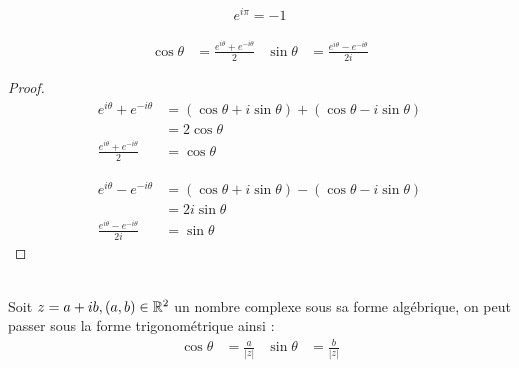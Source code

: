     \begin{graybox}
    \begin{proposition}
    \begin{align*}
        e^{i \pi} = -1 
    \end{align*}
\end{proposition}
    \end{graybox}

    \begin{graybox}
    \begin{proposition}
    \begin{align*}
        \cos{\theta} &= \frac{e^{i\theta} + e^{-i\theta}}{2} & \sin{\theta} &= \frac{e^{i\theta} - e^{-i\theta}}{2i}
    \end{align*}
\end{proposition}
    \end{graybox}
\begin{proof}
        \begin{align*}
            e^{i\theta} + e^{-i\theta} &= (\cos{\theta} + i\sin{\theta}) + (\cos{\theta} - i\sin{\theta}) \\
                                       &= 2\cos{\theta} \\
        \frac{e^{i\theta} + e^{-i\theta}}{2} &= \cos{\theta}
        \end{align*}
        
        \begin{align*}
            e^{i\theta} - e^{-i\theta} &= (\cos{\theta} + i\sin{\theta}) - (\cos{\theta} - i\sin{\theta}) \\
                                       &= 2i\sin{\theta} \\
            \frac{e^{i\theta} - e^{-i\theta}}{2i} &= \sin{\theta} 
        \end{align*}
\end{proof}


\begin{remarque}~ 
    \\
    Soit $z = a + ib, (a, b) \in \mathbb{R}^2$ un nombre complexe sous sa forme algébrique, on peut passer sous la forme trigonométrique ainsi :
    \begin{align*}
        \cos{\theta} &= \frac{a}{|z|} & \sin{\theta} &= \frac{b}{|z|}
    \end{align*}
    \end{remarque}




